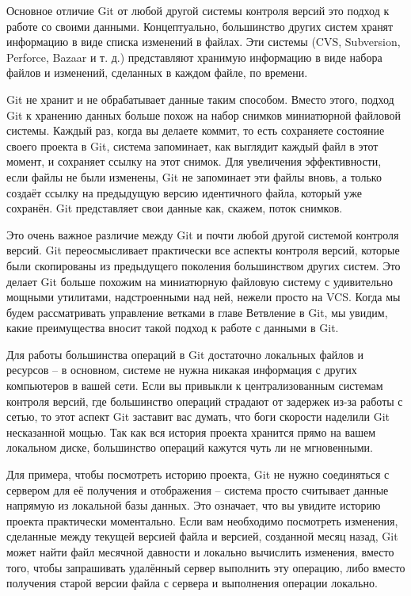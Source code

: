 Основное отличие Git от любой другой системы контроля версий это подход к работе со своими данными. Концептуально, большинство других
систем хранят информацию в виде списка изменений в файлах. Эти системы (CVS,
Subversion, Perforce, Bazaar и т. д.) представляют хранимую информацию в виде набора файлов и изменений, сделанных в каждом файле, по времени.

Git не хранит и не обрабатывает данные таким способом. Вместо этого, подход Git к хранению данных больше похож на набор снимков миниатюрной файловой системы. Каждый раз, когда вы делаете коммит, то есть сохраняете состояние своего проекта в Git, система запоминает, как выглядит каждый файл в этот момент, и сохраняет ссылку на этот снимок. Для увеличения эффективности, если файлы не были изменены, Git не запоминает эти файлы вновь, а только создаёт ссылку на предыдущую версию идентичного файла, который уже сохранён. Git представляет свои данные как, скажем, поток снимков.

Это очень важное различие между Git и почти любой другой системой контроля версий. Git переосмысливает практически все аспекты контроля версий, которые были скопированы из предыдущего поколения большинством других систем. Это делает Git больше похожим на миниатюрную файловую систему с удивительно мощными утилитами, надстроенными над ней, нежели просто на VCS. Когда мы будем рассматривать управление ветками в главе Ветвление в Git, мы увидим, какие преимущества вносит такой подход к работе с данными в Git.

Для работы большинства операций в Git достаточно локальных файлов и ресурсов --  в основном, системе не нужна никакая информация с других компьютеров в вашей сети. Если вы привыкли к централизованным системам контроля версий, где большинство операций страдают от задержек из-за работы с сетью, то этот аспект Git заставит вас думать, что боги скорости наделили Git несказанной мощью. Так как вся история проекта хранится прямо на вашем локальном диске, большинство операций кажутся чуть ли не мгновенными.

Для примера, чтобы посмотреть историю проекта, Git не нужно соединяться с сервером для её получения и отображения -- система просто считывает данные напрямую из локальной базы данных. Это означает, что вы увидите историю проекта практически моментально. Если вам необходимо посмотреть изменения, сделанные между текущей версией файла и версией, созданной месяц назад, Git может найти файл месячной давности и локально вычислить изменения, вместо того, чтобы запрашивать удалённый сервер выполнить эту операцию, либо вместо получения старой версии файла с сервера и выполнения операции локально.

